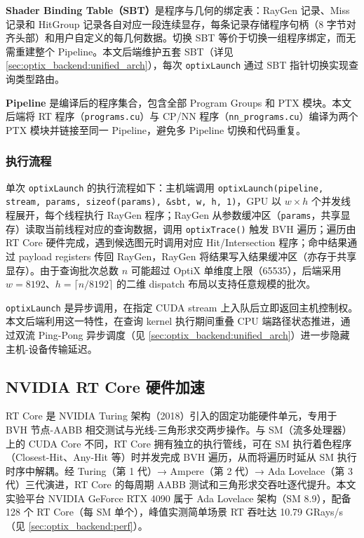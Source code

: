 \textbf{Shader Binding Table（SBT）}是程序与几何的绑定表：RayGen 记录、Miss 记录和 HitGroup 记录各自对应一段连续显存，每条记录存储程序句柄（8 字节对齐头部）和用户自定义的每几何数据。切换 SBT 等价于切换一组程序绑定，而无需重建整个 Pipeline。本文后端维护五套 SBT（详见 \ref{sec:optix_backend:unified_arch}），每次 \texttt{optixLaunch} 通过 SBT 指针切换实现查询类型路由。

\textbf{Pipeline} 是编译后的程序集合，包含全部 Program Groups 和 PTX 模块。本文后端将 RT 程序（\texttt{programs.cu}）与 CP/NN 程序（\texttt{nn\_programs.cu}）编译为两个 PTX 模块并链接至同一 Pipeline，避免多 Pipeline 切换和代码重复。

\subsubsection{执行流程}

单次 \texttt{optixLaunch} 的执行流程如下：主机端调用 \texttt{optixLaunch(pipeline, stream, params, sizeof(params), \&sbt, w, h, 1)}，GPU 以 $w \times h$ 个并发线程展开，每个线程执行 RayGen 程序；RayGen 从参数缓冲区（\texttt{params}，共享显存）读取当前线程对应的查询数据，调用 \texttt{optixTrace()} 触发 BVH 遍历；遍历由 RT Core 硬件完成，遇到候选图元时调用对应 Hit/Intersection 程序；命中结果通过 payload registers 传回 RayGen，RayGen 将结果写入结果缓冲区（亦存于共享显存）。由于查询批次总数 $n$ 可能超过 OptiX 单维度上限（65535），后端采用 $w = 8192$、$h = \lceil n / 8192 \rceil$ 的二维 dispatch 布局以支持任意规模的批次。

\texttt{optixLaunch} 是异步调用，在指定 CUDA stream 上入队后立即返回主机控制权。本文后端利用这一特性，在查询 kernel 执行期间重叠 CPU 端路径状态推进，通过双流 Ping-Pong 异步调度（见 \ref{sec:optix_backend:unified_arch}）进一步隐藏主机-设备传输延迟。

\subsection{NVIDIA RT Core 硬件加速}
\label{sec:optix_backend:rt_core}

RT Core 是 NVIDIA Turing 架构（2018）引入的固定功能硬件单元，专用于 BVH 节点-AABB 相交测试与光线-三角形求交两步操作。与 SM（流多处理器）上的 CUDA Core 不同，RT Core 拥有独立的执行管线，可在 SM 执行着色程序（Closest-Hit、Any-Hit 等）时并发完成 BVH 遍历，从而将遍历时延从 SM 执行时序中解耦。经 Turing（第 1 代）→ Ampere（第 2 代）→ Ada Lovelace（第 3 代）三代演进，RT Core 的每周期 AABB 测试和三角形求交吞吐逐代提升。本文实验平台 NVIDIA GeForce RTX 4090 属于 Ada Lovelace 架构（SM 8.9），配备 128 个 RT Core（每 SM 单个），峰值实测简单场景 RT 吞吐达 10.79 GRays/s（见 \ref{sec:optix_backend:perf}）。

